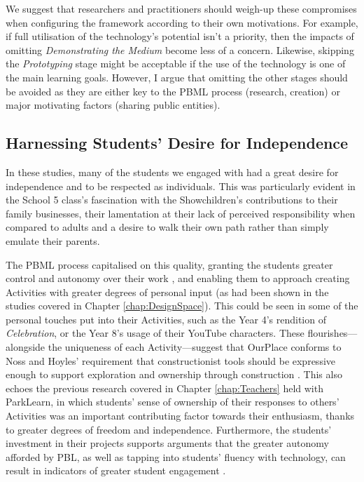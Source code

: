 We suggest that researchers and practitioners should weigh-up these compromises when configuring the framework according to their own motivations. For example, if full utilisation of the technology's potential isn't a priority, then the impacts of omitting \textit{Demonstrating the Medium} become less of a concern. Likewise, skipping the \textit{Prototyping} stage might be acceptable if the use of the technology is one of the main learning goals. However, I argue that omitting the other stages should be avoided as they are either key to the PBML process (research, creation) or major motivating factors (sharing public entities).

\subsection{Harnessing Students' Desire for Independence}
In these studies, many of the students we engaged with had a great desire for independence and to be respected as individuals. This was particularly evident in the School 5 class's fascination with the Showchildren's contributions to their family businesses, their lamentation at their lack of perceived responsibility when compared to adults and a desire to walk their own path rather than simply emulate their parents.

The PBML process capitalised on this quality, granting the students greater control and autonomy over their work \citep{Noss2017, Wurdinger2007}, and enabling them to approach creating Activities with greater degrees of personal input (as had been shown in the studies covered in Chapter \ref{chap:DesignSpace}). This could be seen in some of the personal touches put into their Activities, such as the Year 4's rendition of \textit{Celebration}, or the Year 8's usage of their YouTube characters. These flourishes---alongside the uniqueness of each Activity---suggest that OurPlace conforms to Noss and Hoyles' requirement that constructionist tools should be expressive enough to support exploration and ownership through construction \citep{Noss2017}. This also echoes the previous research covered in Chapter \ref{chap:Teachers} held with ParkLearn, in which students' sense of ownership of their responses to others' Activities was an important contributing factor towards their enthusiasm, thanks to greater degrees of freedom and independence. Furthermore, the students' investment in their projects supports arguments that the greater autonomy afforded by PBL, as well as tapping into students' fluency with technology, can result in indicators of greater student engagement \citep{Wurdinger2007, Bell2010}.

